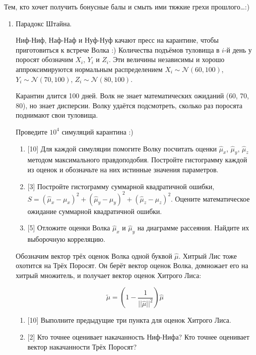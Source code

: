 \documentclass[12pt]{article}
\def \cN{\mathcal{N}}
\begin{document}
\newpage
Тем, кто хочет получить бонусные балы и смыть ими тяжкие грехи прошлого\ldots :)

\begin{enumerate}[resume]

\item Парадокс Штайна. 


Ниф-Ниф, Наф-Наф и Нуф-Нуф качают пресс на карантине, чтобы приготовиться к встрече Волка :)
Количества подъёмов туловища в $i$-й день у поросят обозначим $X_i$, $Y_i$ и $Z_i$. 
Эти величины независимы и хорошо аппроксимируются нормальным распределением 
$X_i \sim \cN(60, 100)$, $Y_i \sim \cN(70, 100)$, $Z_i \sim \cN(80, 100)$.

Карантин длится 100 дней. Волк не знает математических ожиданий (60, 70, 80), но знает дисперсии. 
Волку удаётся подсмотреть, сколько раз поросята поднимают свои туловища. 

Проведите $10^4$ симуляций карантина :)

\begin{enumerate}
    \item {[10]} Для каждой симуляции помогите Волку посчитать оценки $\hat\mu_x$, $\hat\mu_y$, $\hat\mu_z$ методом максимального 
    правдоподобия. Постройте гистограмму каждой из оценок и обозначьте на них истинные значения параметров.
    \item {[3]} Постройте гистограмму суммарной квадратичной ошибки, $S = (\hat\mu_x - \mu_x)^2 + (\hat\mu_y - \mu_y)^2 +(\hat\mu_z - \mu_z)^2$.
    Оцените математическое ожидание суммарной квадратичной ошибки. 
    \item {[5]} Отложите оценки Волка $\hat \mu_x$ и $\hat \mu_y$ на диаграмме рассеяния. Найдите их выборочную корреляцию.
\end{enumerate}

Обозначим вектор трёх оценок Волка одной буквой $\hat \mu$. Хитрый Лис тоже охотится на Трёх Поросят. 
Он берёт вектор оценок Волка, домножает его на хитрый множитель, и получает вектор оценок Хитрого Лиса:

\[
\tilde \mu = \left( 1 - \frac{1}{||\hat \mu||^2}\right) \hat \mu    
\]

\begin{enumerate}[resume]
    \item {[10]} Выполните предыдущие три пункта для оценок Хитрого Лиса.
    \item {[2]} Кто точнее оценивает накачанность Ниф-Нифа? Кто точнее оценивает вектор накачанности Трёх Поросят?
\end{enumerate}


\end{enumerate}
\end{document}
